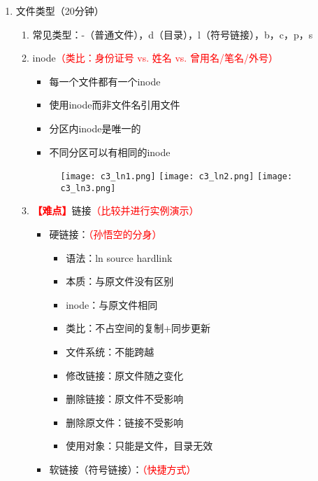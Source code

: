 \documentclass{TIJMUjiaoanLL}
\begin{document}
\begin{enumerate}
  \item 文件类型（20分钟）
    \begin{enumerate}
      \item 常见类型：-（普通文件），d（目录），l（符号链接），b，c，p，s
      \item inode\textcolor{red}{（类比：身份证号 vs. 姓名 vs. 曾用名/笔名/外号）}
        \vspace*{-10pt}
        \begin{multicols}{2}
          \begin{itemize}
	    \item 每一个文件都有一个inode
	    \item 使用inode而非文件名引用文件
	    \item 分区内inode是唯一的
	    \item 不同分区可以有相同的inode
	  \end{itemize}
        \end{multicols}
        \vspace*{-20pt}
        \begin{figure}[h]
	  \centering
	  \texttt{[image: c3\_ln1.png]}
	  \texttt{[image: c3\_ln2.png]}
	  \texttt{[image: c3\_ln3.png]}
	\end{figure}
        \vspace*{-15pt}
      \item \textcolor{red}{\textbf{【难点】}}链接\textcolor{red}{（比较并进行实例演示）}
        \vspace*{-10pt}
        \begin{multicols}{2}
 	  \begin{itemize}
      \item 硬链接：\textcolor{red}{（孙悟空的分身）}
	      \begin{itemize}
                \item 语法：ln source hardlink
		\item 本质：与原文件没有区别
		\item inode：与原文件相同
		\item 类比：不占空间的复制+同步更新
		\item 文件系统：不能跨越
		\item 修改链接：原文件随之变化
		\item 删除链接：原文件不受影响
		\item 删除原文件：链接不受影响
		\item 使用对象：只能是文件，目录无效
	      \end{itemize}
      \item 软链接（符号链接）：\textcolor{red}{（快捷方式）}

\end{itemize}
\end{multicols}
\end{enumerate}
\end{enumerate}
\end{document}
